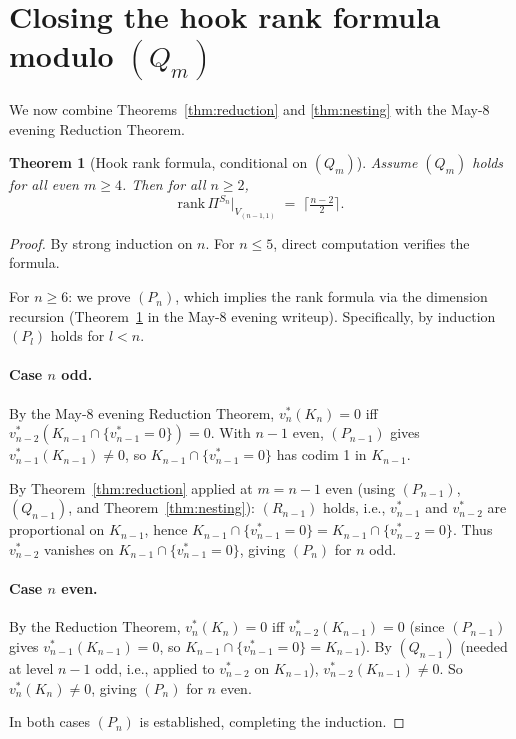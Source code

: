\documentclass[11pt]{article}
\newtheorem{theorem}{Theorem}
\theoremstyle{definition}
\begin{document}
\section{Closing the hook rank formula modulo $(Q_m)$}
\label{sec:closing}

We now combine Theorems~\ref{thm:reduction} and \ref{thm:nesting}
with the May-8 evening Reduction Theorem.

\begin{theorem}[Hook rank formula, conditional on $(Q_m)$]\label{thm:rank}
Assume $(Q_m)$ holds for all even $m \ge 4$. Then for all $n \ge 2$,
\[
   \mathrm{rank}\,\Pi^{S_n}|_{V_{(n-1,1)}} \;=\; \big\lceil \tfrac{n-2}{2} \big\rceil.
\]
\end{theorem}

\begin{proof}
By strong induction on $n$. For $n \le 5$, direct computation
verifies the formula.

For $n \ge 6$: we prove $(P_n)$, which implies the rank formula via
the dimension recursion (Theorem~\ref{thm:rank} in the May-8 evening
writeup). Specifically, by induction $(P_l)$ holds for $l < n$.

\paragraph{Case $n$ odd.}
By the May-8 evening Reduction Theorem,
$v_n^*(K_n) = 0$ iff $v_{n-2}^*(K_{n-1} \cap \{v_{n-1}^* = 0\}) = 0$.
With $n-1$ even, $(P_{n-1})$ gives $v_{n-1}^*(K_{n-1}) \neq 0$, so
$K_{n-1} \cap \{v_{n-1}^*=0\}$ has codim 1 in $K_{n-1}$.

By Theorem~\ref{thm:reduction} applied at $m = n-1$ even (using
$(P_{n-1})$, $(Q_{n-1})$, and Theorem~\ref{thm:nesting}):
$(R_{n-1})$ holds, i.e., $v_{n-1}^*$ and $v_{n-2}^*$ are proportional
on $K_{n-1}$, hence $K_{n-1} \cap \{v_{n-1}^*=0\} = K_{n-1} \cap
\{v_{n-2}^*=0\}$. Thus $v_{n-2}^*$ vanishes on
$K_{n-1} \cap \{v_{n-1}^*=0\}$, giving $(P_n)$ for $n$ odd.

\paragraph{Case $n$ even.}
By the Reduction Theorem, $v_n^*(K_n) = 0$ iff
$v_{n-2}^*(K_{n-1}) = 0$ (since $(P_{n-1})$ gives $v_{n-1}^*(K_{n-1}) = 0$,
so $K_{n-1} \cap \{v_{n-1}^*=0\} = K_{n-1}$). By $(Q_{n-1})$
(needed at level $n-1$ odd, i.e., applied to $v_{n-2}^*$ on $K_{n-1}$),
$v_{n-2}^*(K_{n-1}) \neq 0$. So $v_n^*(K_n) \neq 0$, giving
$(P_n)$ for $n$ even.

In both cases $(P_n)$ is established, completing the induction. \qedhere
\end{proof}
\end{document}
